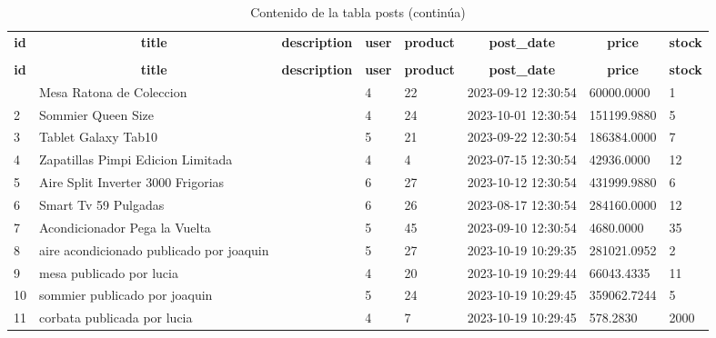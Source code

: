 %
%
 \begin{longtable}{|l|l|l|l|l|l|l|l|} 
 \hline \endhead \hline \endfoot \hline 
 \caption{Contenido de la tabla posts} \label{tab:posts-data} \\\hline \multicolumn{1}{|c|}{\textbf{id}} & \multicolumn{1}{|c|}{\textbf{title}} & \multicolumn{1}{|c|}{\textbf{description}} & \multicolumn{1}{|c|}{\textbf{user}} & \multicolumn{1}{|c|}{\textbf{product}} & \multicolumn{1}{|c|}{\textbf{post\_date}} & \multicolumn{1}{|c|}{\textbf{price}} & \multicolumn{1}{|c|}{\textbf{stock}} \\ \hline \hline  \endfirsthead 
\caption{Contenido de la tabla posts (continúa)} \\ \hline \multicolumn{1}{|c|}{\textbf{id}} & \multicolumn{1}{|c|}{\textbf{title}} & \multicolumn{1}{|c|}{\textbf{description}} & \multicolumn{1}{|c|}{\textbf{user}} & \multicolumn{1}{|c|}{\textbf{product}} & \multicolumn{1}{|c|}{\textbf{post\_date}} & \multicolumn{1}{|c|}{\textbf{price}} & \multicolumn{1}{|c|}{\textbf{stock}} \\ \hline \hline \endhead \endfoot
1 & Mesa Ratona de Coleccion &  & 4 & 22 & 2023-09-12 12:30:54 & 60000.0000 & 1 \\ \hline 
2 & Sommier Queen Size &  & 4 & 24 & 2023-10-01 12:30:54 & 151199.9880 & 5 \\ \hline 
3 & Tablet Galaxy Tab10 &  & 5 & 21 & 2023-09-22 12:30:54 & 186384.0000 & 7 \\ \hline 
4 & Zapatillas Pimpi Edicion Limitada &  & 4 & 4 & 2023-07-15 12:30:54 & 42936.0000 & 12 \\ \hline 
5 & Aire Split Inverter 3000 Frigorias &  & 6 & 27 & 2023-10-12 12:30:54 & 431999.9880 & 6 \\ \hline 
6 & Smart Tv 59 Pulgadas &  & 6 & 26 & 2023-08-17 12:30:54 & 284160.0000 & 12 \\ \hline 
7 & Acondicionador Pega la Vuelta &  & 5 & 45 & 2023-09-10 12:30:54 & 4680.0000 & 35 \\ \hline 
8 & aire acondicionado publicado por joaquin &  & 5 & 27 & 2023-10-19 10:29:35 & 281021.0952 & 2 \\ \hline 
9 & mesa publicado por lucia &  & 4 & 20 & 2023-10-19 10:29:44 & 66043.4335 & 11 \\ \hline 
10 & sommier publicado por joaquin &  & 5 & 24 & 2023-10-19 10:29:45 & 359062.7244 & 5 \\ \hline 
11 & corbata publicada por lucia &  & 4 & 7 & 2023-10-19 10:29:45 & 578.2830 & 2000 \\ \hline 

\end{longtable}
